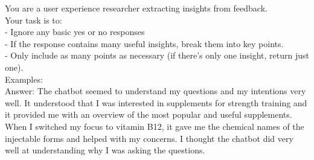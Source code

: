 \begin{figure*}[h]
    \centering
    \small
\begin{tcolorbox}[colback=gray!1, colframe=black!50, title=Insight Filtering Prompt:]
You are a user experience researcher extracting insights from feedback.\\
Your task is to:\\
- Ignore any basic yes or no responses\\
- If the response contains many useful insights, break them into key points.\\
- Only include as many points as necessary (if there's only one insight, return just one).\\

Examples:\\
\hspace*{1em}Answer: The chatbot seemed to understand my questions and my intentions very well. It understood that I was \hspace*{1em}interested in supplements for strength training and it provided me with an overview of the most popular and useful \hspace*{1em}supplements. When I switched my focus to vitamin B12, it gave me the chemical names of the injectable forms and \hspace*{1em}helped with my concerns. I thought the chatbot did very well at understanding why I was asking the questions.


\end{tcolorbox}
\end{figure*}
